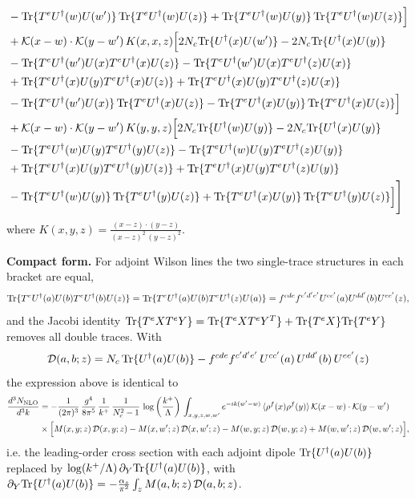 \documentclass[9pt]{article}
\numberwithin{equation}{section}
\begin{document}
\begin{align}
&-{\rm Tr}\{T^eU^\dagger(w)U(w')\}\,{\rm Tr}\{T^eU^\dagger(w)U(z)\}+{\rm Tr}\{T^eU^\dagger(w)U(y)\}\,{\rm Tr}\{T^eU^\dagger(w)U(z)\}\Big]\notag\\
&+\mathcal K(x-w)\cdot\mathcal K(y-w')\,K(x,x,z)\Big[2 N_{c}{\rm Tr}\{U^\dagger(x)U(w')\}-2 N_{c}{\rm Tr}\{U^\dagger(x)U(y)\}\notag\\
&-{\rm Tr}\{T^eU^\dagger(w')U(x)T^eU^\dagger(x)U(z)\}-{\rm Tr}\{T^eU^\dagger(w')U(x)T^eU^\dagger(z)U(x)\}\notag\\
&+{\rm Tr}\{T^eU^\dagger(x)U(y)T^eU^\dagger(x)U(z)\}+{\rm Tr}\{T^eU^\dagger(x)U(y)T^eU^\dagger(z)U(x)\}\notag\\
&-{\rm Tr}\{T^eU^\dagger(w')U(x)\}\,{\rm Tr}\{T^eU^\dagger(x)U(z)\}-{\rm Tr}\{T^eU^\dagger(x)U(y)\}\,{\rm Tr}\{T^eU^\dagger(x)U(z)\}\Big]\notag\\
&+\mathcal K(x-w)\cdot\mathcal K(y-w')\,K(y,y,z)\Big[2 N_{c}{\rm Tr}\{U^\dagger(w)U(y)\}-2 N_{c}{\rm Tr}\{U^\dagger(x)U(y)\}\notag\\
&-{\rm Tr}\{T^eU^\dagger(w)U(y)T^eU^\dagger(y)U(z)\}-{\rm Tr}\{T^eU^\dagger(w)U(y)T^eU^\dagger(z)U(y)\}\notag\\
&+{\rm Tr}\{T^eU^\dagger(x)U(y)T^eU^\dagger(y)U(z)\}+{\rm Tr}\{T^eU^\dagger(x)U(y)T^eU^\dagger(z)U(y)\}\notag\\
&-{\rm Tr}\{T^eU^\dagger(w)U(y)\}\,{\rm Tr}\{T^eU^\dagger(y)U(z)\}+{\rm Tr}\{T^eU^\dagger(x)U(y)\}\,{\rm Tr}\{T^eU^\dagger(y)U(z)\}\Big]\Bigg]
\end{align}
where $K(x,y,z) = \frac{(x-z)\cdot (y-z)}{(x-z)^{2}\,(y-z)^{2}}$.

\noindent\textbf{Compact form.} For adjoint Wilson lines the two single-trace structures in each bracket are equal,
\begin{equation}
{\rm Tr}\{T^{e}U^{\dagger}(a)U(b)T^{e}U^{\dagger}(b)U(z)\}={\rm Tr}\{T^{e}U^{\dagger}(a)U(b)T^{e}U^{\dagger}(z)U(a)\}=f^{cde}f^{c'd'e'}U^{cc'}(a)U^{dd'}(b)U^{ee'}(z),
\end{equation}
and the Jacobi identity
${\rm Tr}\{T^{e}XT^{e}Y\}={\rm Tr}\{T^{e}XT^{e}Y^{T}\}+{\rm Tr}\{T^{e}X\}{\rm Tr}\{T^{e}Y\}$ removes all double traces. With
\begin{equation}
\mathcal{D}(a,b;z)=N_{c}\,{\rm Tr}\{U^{\dagger}(a)U(b)\}-f^{cde}f^{c'd'e'}\,U^{cc'}(a)\,U^{dd'}(b)\,U^{ee'}(z)
\end{equation}
the expression above is identical to
\begin{align}
\frac{d^{3}N_{\mathrm{NLO}}}{d^{3}k} & = -\frac{1}{(2\pi)^{3}}\,\frac{g^{4}}{8\pi^{5}}\,\frac{1}{k^{+}}\,\frac{1}{N^{2}_{c}-1}\,\log{\left(\frac{k^{+}}{\Lambda}\right)}\,\int_{x,y,z,w,w'}e^{-ik(w'-w)}\,\langle\rho^{f}(x)\rho^{f}(y) \rangle\,\mathcal K(x-w)\cdot\mathcal K(y-w')\notag\\
&\times\Big[M(x,y;z)\,\mathcal{D}(x,y;z)-M(x,w';z)\,\mathcal{D}(x,w';z)-M(w,y;z)\,\mathcal{D}(w,y;z)+M(w,w';z)\,\mathcal{D}(w,w';z)\Big],
\end{align}
i.e. the leading-order cross section with each adjoint dipole ${\rm Tr}\{U^{\dagger}(a)U(b)\}$ replaced by $\log(k^{+}/\Lambda)\,\partial_{Y}{\rm Tr}\{U^{\dagger}(a)U(b)\}$, with $\partial_{Y}{\rm Tr}\{U^{\dagger}(a)U(b)\}=-\frac{\alpha_{s}}{\pi^{2}}\int_{z}M(a,b;z)\,\mathcal{D}(a,b;z)$.
\end{document}
